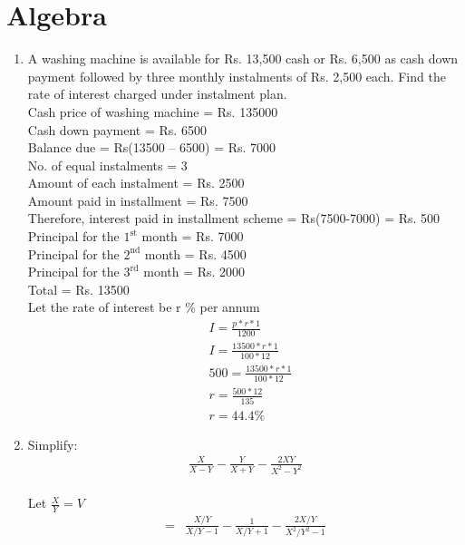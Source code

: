 \documentclass[journal,12pt,twocolumn]{IEEEtran}
\renewcommand\thesection{\arabic{section}}
\begin{document}
\section{Algebra}
\renewcommand{\theequation}{\theenumi}
\begin{enumerate}[label=\thesection.\arabic*.,ref=\thesection.\theenumi]
\item A washing machine is available for Rs. 13,500
cash or Rs. 6,500 as cash down payment
followed by three monthly instalments of Rs.
2,500 each. Find the rate of interest charged
under instalment plan.\\
\solution
Cash price of washing machine = Rs. 135000\\
Cash down payment = Rs. 6500\\
Balance due = Rs(13500 – 6500) = Rs. 7000\\
No. of equal instalments = 3\\
Amount of each instalment = Rs. 2500\\
Amount paid in installment = Rs. 7500\\
Therefore, interest paid in installment scheme = Rs(7500-7000) = Rs. 500\\
Principal for the $1^{\text{st}}$ month = Rs. 7000\\
Principal for the $2^{\text{nd}}$ month = Rs. 4500\\
Principal for the $3^{\text{rd}}$ month = Rs. 2000\\
Total = Rs. 13500\\
Let the rate of interest be r \% per annum\\
\begin{align}
&I = \displaystyle\frac{p*r*1}{1200}\\
&I = \displaystyle\frac{13500*r*1} { 100*12}\\
&500 =\displaystyle\frac{13500*r*1 }{ 100*12}\\
&r = \displaystyle\frac{500*12}{ 135}\\
&r = 44.4 \%
\end{align}
\item Simplify:
\begin{align}
\displaystyle\frac{X}{X-Y}-\displaystyle\frac{Y}{X+Y}-\displaystyle\frac{2XY}{X^2-Y^2} \nonumber \label{eq:1-third}
\end{align}
\solution \\
Let $\displaystyle\frac{X}{Y} = V$
 \begin{align}
=&\displaystyle\frac{X/Y}{X/Y-1}-\displaystyle\frac{1}{X/Y+1}-\displaystyle\frac{2X/Y}{X^2/Y^2-1}\\

\end{align}
\end{enumerate}
\end{document}
